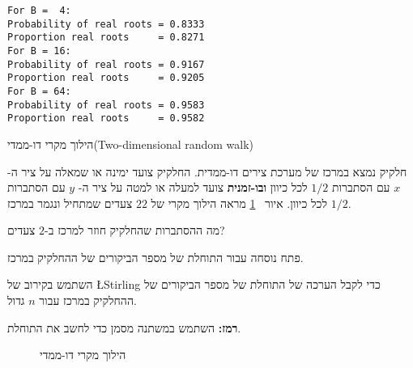 \sml{}
\begin{verbatim}
For B =  4:
Probability of real roots = 0.8333
Proportion real roots     = 0.8271
For B = 16:
Probability of real roots = 0.9167
Proportion real roots     = 0.9205
For B = 64:
Probability of real roots = 0.9583
Proportion real roots     = 0.9582
\end{verbatim}


\begin{prob}{הילוך מקרי דו-ממדי}{}{(Two-dimensional random walk)}

חלקיק נמצא במרכז של מערכת צירים דו-ממדית. החלקיק צועד ימינה או שמאלה על ציר ה-%
$x$
עם הסתברות 
$1/2$
לכל כיוון 
\textbf{ובו-זמנית}
צועד למעלה או למטה על ציר ה-%
$y$
עם הסתברות 
$1/2$
לכל כיוון. איור%
~\ref{f.2d-random-walk}
מראה הילוך מקרי של 
$22$
צעדים שמתחיל ונגמר במרכז.

מה ההסתברות שהחלקיק חוזר למרכז ב-$2$ צעדים?

פתח נוסחה עבור התוחלת של מספר הביקורים של ההחלקיק במרכז.

השתמש בקירוב של
\L{Stirling}
כדי לקבל הערכה של התוחלת של מספר הביקורים של ההחלקיק במרכז עבור $n$ גדול.

\textbf{רמז:}
השתמש במשתנה מסמן כדי לחשב את התוחלת.
\begin{figure}[t]
\begin{center}
\end{center}
\caption{הילוך מקרי דו-ממדי}\label{f.2d-random-walk}
\end{figure}
\end{prob}

